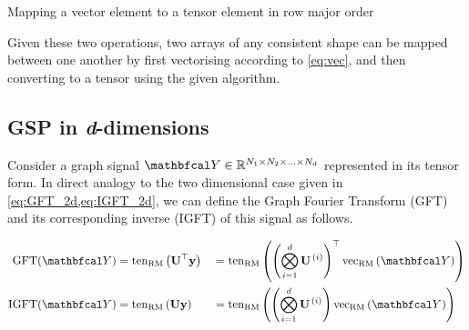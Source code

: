 \begin{algorithm}[t]
    \hypertarget{vectoten}{}
    \label{al:vectoten}
    \caption{Mapping a vector element to a tensor element in row major order}
    \begin{algorithmic}
    \vspace{0.15cm}
    \vspace{0.1cm}
    \vspace{0.25cm}
    \vspace{0.25cm}
    \vspace{0.25cm}
    \vspace{0.15cm}
    \vspace{0.15cm}
    \EndFor
    \vspace{0.25cm}
    \end{algorithmic}
\end{algorithm}



Given these two operations, two arrays of any consistent shape can be mapped between one another by first vectorising according to \cref{eq:vec}, and then converting to a tensor using the given algorithm.



\subsection{GSP in \textit{d}-dimensions}



Consider a graph signal $\Yt \in \R^{N_1 \times N_2 \times ... \times N_d}$ represented in its tensor form. In direct analogy to the two dimensional case given in \cref{eq:GFT_2d,eq:IGFT_2d}, we can define the Graph Fourier Transform (GFT) and its corresponding inverse (IGFT) of this signal as follows. 

\begin{alignat}{2}
\label{eq:gft_nd}
    \text{GFT}(\Yt) & = \tenrm{\U^\top \y} && = \tenrm{\left(  \bigotimes_{i=1}^d  \U^{\,(i)} \right)^\top \vecrm{\Yt} } \\
\label{eq:igft_nd}
    \text{IGFT}(\Yt) & = \tenrm{\U \y} && = \tenrm{\left(  \bigotimes_{i=1}^d  \U^{\,(i)} \right) \vecrm{\Yt} }
\end{alignat}

